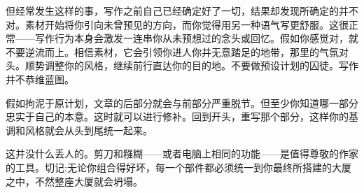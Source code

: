 但经常发生这样的事，写作之前自己已经确定好了一切，结果却发现所确定的并不对。素材开始将你引向未曾预见的方向，而你觉得用另一种语气写更舒服。这很正常——写作行为本身会激发一连串你从未预想过的念头或回忆。假如你感觉对，就不要逆流而上。相信素材，它会引领你进人你并无意踏足的地带，那里的气氛对头。顺势调整你的风格，继续前行直达你的目的地。不要做预设计划的囚徒。写作并不恭维蓝图。

假如拘泥于原计划，文章的后部分就会与前部分严重脱节。但至少你知道哪一部分忠实于自己的本意。这时就可以进行修补。回到开头，重写那个部分，这样你的基调和风格就会从头到尾统一起来。

这并没什么丢人的。剪刀和糨糊——或者电脑上相同的功能——是值得尊敬的作家的工具。切记:无论你组合得好坏，每一个部件都必须统一到你最终所搭建的大厦之中，不然整座大厦就会坍塌。